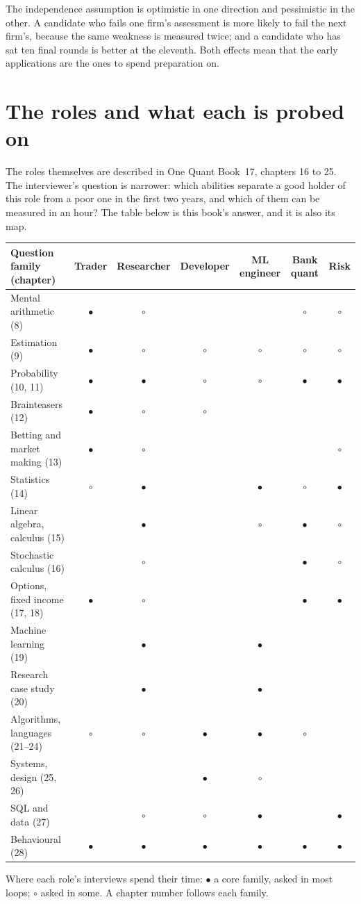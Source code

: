 The independence assumption is optimistic in one direction and pessimistic in the other. A candidate who
fails one firm's assessment is more likely to fail the next firm's, because the same weakness is measured
twice; and a candidate who has sat ten final rounds is better at the eleventh. Both effects mean that the
early applications are the ones to spend preparation on.

\section{The roles and what each is probed on}

The roles themselves are described in One Quant Book~17, chapters 16 to 25. The interviewer's question is
narrower: which abilities separate a good holder of this role from a poor one in the first two years, and
which of them can be measured in an hour? The table below is this book's answer, and it is also its map.

\begin{center}
\small
\begin{tabular}{@{}lcccccc@{}}
\toprule
Question family (chapter) & Trader & Researcher & Developer & ML engineer & Bank quant & Risk \\
\midrule
Mental arithmetic (8) & $\bullet$ & $\circ$ & & & $\circ$ & $\circ$ \\
Estimation (9) & $\bullet$ & $\circ$ & $\circ$ & $\circ$ & $\circ$ & $\circ$ \\
Probability (10, 11) & $\bullet$ & $\bullet$ & $\circ$ & $\circ$ & $\bullet$ & $\bullet$ \\
Brainteasers (12) & $\bullet$ & $\circ$ & $\circ$ & & & \\
Betting and market making (13) & $\bullet$ & $\circ$ & & & & $\circ$ \\
Statistics (14) & $\circ$ & $\bullet$ & & $\bullet$ & $\circ$ & $\bullet$ \\
Linear algebra, calculus (15) & & $\bullet$ & & $\circ$ & $\bullet$ & $\circ$ \\
Stochastic calculus (16) & & $\circ$ & & & $\bullet$ & $\circ$ \\
Options, fixed income (17, 18) & $\bullet$ & $\circ$ & & & $\bullet$ & $\bullet$ \\
Machine learning (19) & & $\bullet$ & & $\bullet$ & & \\
Research case study (20) & & $\bullet$ & & $\bullet$ & & \\
Algorithms, languages (21--24) & $\circ$ & $\circ$ & $\bullet$ & $\bullet$ & $\circ$ & \\
Systems, design (25, 26) & & & $\bullet$ & $\circ$ & & \\
SQL and data (27) & & $\circ$ & $\circ$ & $\bullet$ & & $\bullet$ \\
Behavioural (28) & $\bullet$ & $\bullet$ & $\bullet$ & $\bullet$ & $\bullet$ & $\bullet$ \\
\bottomrule
\end{tabular}

\smallskip
{\small Where each role's interviews spend
their time: $\bullet$ a core family, asked in most loops; $\circ$ asked in some. A chapter number follows each
family.}
\end{center}

